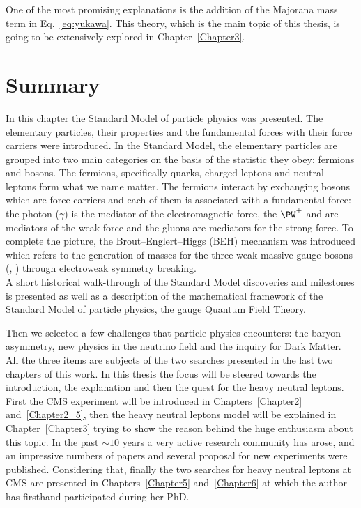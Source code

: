 One of the most promising explanations is the addition of the Majorana mass term in Eq.~\ref{eq:yukawa}. This theory, which is the main topic of this thesis, is going to be extensively explored in Chapter~\ref{Chapter3}.

\section{Summary}\label{sec:summaryC1}
In this chapter the Standard Model of particle physics was presented.
The elementary particles, 
their properties and the fundamental forces with their force carriers were introduced. 
In the Standard Model, the elementary particles are grouped into two main categories on the basis of the statistic they obey: fermions and bosons. The fermions, specifically quarks, charged leptons and neutral leptons form what we name matter. The fermions interact by exchanging bosons which are force carriers and each of them is associated with a fundamental force: the photon ($\gamma$) is the mediator of the electromagnetic force, the $\PW^{\pm}$ and \PZ are mediators of the weak force and the gluons are mediators for the strong force.
To complete the picture, the Brout–Englert–Higgs (BEH) mechanism was introduced which refers to the generation of masses for the three weak massive gauge bosons (\PW, \PZ) through electroweak symmetry breaking.\\
A short historical walk-through of the Standard Model discoveries and milestones is presented as well as a description of the mathematical framework of the Standard Model of particle physics, the gauge Quantum Field Theory.

Then we selected a few challenges that particle
physics encounters: the baryon asymmetry, new physics in the neutrino field and
the inquiry for Dark Matter. All the three items are subjects of the two searches presented in the last two chapters of this work. In this thesis the focus will be steered towards the introduction, the explanation and then the quest for the heavy neutral leptons. \\
First the CMS experiment will be introduced in Chapters~\ref{Chapter2} and~\ref{Chapter2_5}, then the heavy neutral leptons model will be explained in Chapter~\ref{Chapter3} trying to show the reason behind the huge enthusiasm about this topic. In the past $\sim10$ years a very active research community has arose, and an impressive numbers of papers and several proposal for new experiments were published. Considering that, finally the two searches for heavy neutral leptons at CMS are presented in Chapters~\ref{Chapter5} and~\ref{Chapter6} at which the author has firsthand participated during her PhD.


